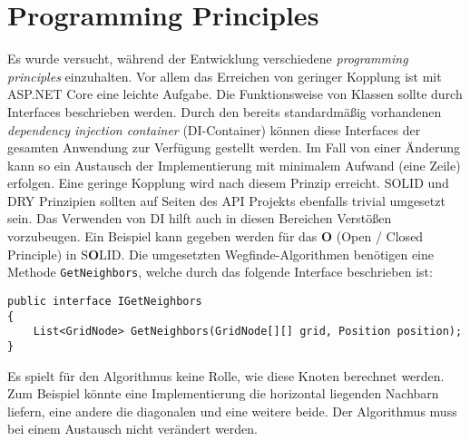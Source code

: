 \part{Programming Principles}
Es wurde versucht, während der Entwicklung
verschiedene \textit{programming principles} einzuhalten.
Vor allem das Erreichen von geringer Kopplung ist mit
ASP.NET Core eine leichte Aufgabe.
Die Funktionsweise von Klassen sollte durch Interfaces beschrieben werden.
Durch den bereits standardmäßig vorhandenen \textit{dependency injection container} (DI-Container)
können diese Interfaces der gesamten Anwendung zur Verfügung gestellt werden.
Im Fall von einer Änderung kann so ein Austausch der
Implementierung mit minimalem Aufwand (eine Zeile) erfolgen.
Eine geringe Kopplung wird nach diesem Prinzip erreicht.
SOLID und DRY Prinzipien sollten auf Seiten des API Projekts ebenfalls trivial umgesetzt sein.
Das Verwenden von DI hilft auch in diesen Bereichen Verstößen vorzubeugen.
Ein Beispiel kann gegeben werden für das \textbf{O} (Open / Closed Principle)
in S\textbf{O}LID. Die umgesetzten Wegfinde-Algorithmen benötigen eine Methode
\texttt{GetNeighbors}, welche durch das folgende Interface beschrieben ist:

\begin{lstlisting}[caption={GetNeighbors Interface},label={code:test}]
public interface IGetNeighbors
{
    List<GridNode> GetNeighbors(GridNode[][] grid, Position position);
}
\end{lstlisting}
Es spielt für den Algorithmus keine Rolle, wie diese Knoten berechnet werden.
Zum Beispiel könnte eine Implementierung die horizontal liegenden Nachbarn liefern,
eine andere die diagonalen und eine weitere beide. Der Algorithmus muss bei
einem Austausch nicht verändert werden.